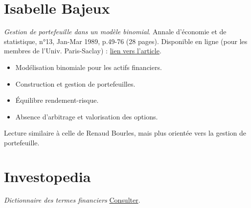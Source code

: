 \documentclass[a4paper,10pt]{article}
\begin{document}
\section*{Isabelle Bajeux}
{}
\textit{Gestion de portefeuille dans un modèle binomial}. Annale d'économie et de statistique, n°13, Jan-Mar 1989, p.49-76 (28 pages).
Disponible en ligne (pour les membres de l'Univ. Paris-Saclay) : \href{https://www.jstor.org/stable/20075729}{lien vers l'article}.
\begin{itemize}
    \item Modélisation binomiale pour les actifs financiers.
    \item Construction et gestion de portefeuilles.
    \item Équilibre rendement-risque.
    \item Absence d’arbitrage et valorisation des options.
\end{itemize}
Lecture similaire à celle de Renaud Bourles, mais plus orientée vers la gestion de portefeuille.\\

\vspace{1em}

\section*{Investopedia}
{}
\textit{Dictionnaire des termes financiers} \href{https://www.investopedia.com/financial-term-dictionary-4769738}{Consulter}.
\end{document}
